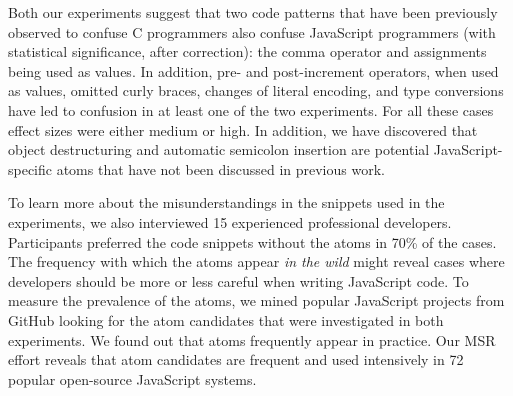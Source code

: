 Both our experiments suggest that two code patterns that have been previously observed to confuse C programmers also confuse JavaScript programmers (with statistical significance, after correction): the comma operator and assignments being used as values. In addition, pre- and post-increment operators, when used as values, omitted curly braces, changes of literal encoding, and type conversions have led to confusion in at least one of the two experiments. For all these cases effect sizes were either medium or high. In addition, we have discovered that object destructuring and automatic semicolon insertion are potential JavaScript-specific atoms that have not been discussed in previous work.

To learn more about the misunderstandings in the snippets used in the experiments, we also interviewed 15 experienced professional developers. Participants preferred the code snippets without the atoms in 70\% of the cases. The frequency with which the atoms appear \emph{in the wild} might reveal cases where developers should be more or less careful when writing JavaScript code. To measure the prevalence of the atoms, we mined popular JavaScript projects from GitHub looking for the atom candidates that were investigated in both experiments. We found out that atoms frequently appear in practice. 
Our MSR effort reveals that atom candidates are frequent and used intensively in 72 popular open-source JavaScript systems.


